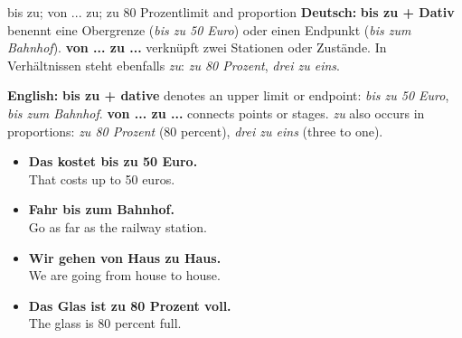 \documentclass[a4paper,11pt]{article}
\newcommand{\GermanText}[1]{\textbf{Deutsch: }#1\par}
\newcommand{\EnglishText}[1]{{\small\color{SoftGray}\textbf{English: }#1\par}}
\newcommand{\ExampleItem}[2]{\item \textbf{#1}\\{\small\color{SoftGray}#2}}
\begin{document}
\begin{grammarentry}{bis zu; von ... zu; zu 80 Prozent}{limit and proportion}
\GermanText{\textbf{bis zu + Dativ} benennt eine Obergrenze (\emph{bis zu 50 Euro}) oder einen Endpunkt (\emph{bis zum Bahnhof}). \textbf{von ... zu ...} verknüpft zwei Stationen oder Zustände. In Verhältnissen steht ebenfalls \emph{zu}: \emph{zu 80 Prozent}, \emph{drei zu eins}.}
\EnglishText{\textbf{bis zu + dative} denotes an upper limit or endpoint: \emph{bis zu 50 Euro}, \emph{bis zum Bahnhof}. \textbf{von ... zu ...} connects points or stages. \emph{zu} also occurs in proportions: \emph{zu 80 Prozent} (80 percent), \emph{drei zu eins} (three to one).}
\end{grammarentry}
\begin{exbox}\begin{itemize}
\ExampleItem{Das kostet bis zu 50 Euro.}{That costs up to 50 euros.}
\ExampleItem{Fahr bis zum Bahnhof.}{Go as far as the railway station.}
\ExampleItem{Wir gehen von Haus zu Haus.}{We are going from house to house.}
\ExampleItem{Das Glas ist zu 80 Prozent voll.}{The glass is 80 percent full.}
\end{itemize}\end{exbox}
\end{document}
